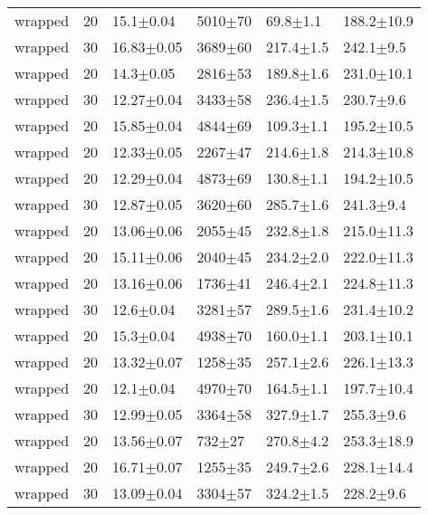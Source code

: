 \begin{tabular}{lrllll}
      wrapped &      20 &    15.1$\pm$0.04 &  5010$\pm$70 &    69.8$\pm$1.1 &  188.2$\pm$10.9 \\
      wrapped &      30 &   16.83$\pm$0.05 &  3689$\pm$60 &   217.4$\pm$1.5 &   242.1$\pm$9.5 \\
      wrapped &      20 &    14.3$\pm$0.05 &  2816$\pm$53 &   189.8$\pm$1.6 &  231.0$\pm$10.1 \\
      wrapped &      30 &   12.27$\pm$0.04 &  3433$\pm$58 &   236.4$\pm$1.5 &   230.7$\pm$9.6 \\
      wrapped &      20 &   15.85$\pm$0.04 &  4844$\pm$69 &   109.3$\pm$1.1 &  195.2$\pm$10.5 \\
      wrapped &      20 &   12.33$\pm$0.05 &  2267$\pm$47 &   214.6$\pm$1.8 &  214.3$\pm$10.8 \\
      wrapped &      20 &   12.29$\pm$0.04 &  4873$\pm$69 &   130.8$\pm$1.1 &  194.2$\pm$10.5 \\
      wrapped &      30 &   12.87$\pm$0.05 &  3620$\pm$60 &   285.7$\pm$1.6 &   241.3$\pm$9.4 \\
      wrapped &      20 &   13.06$\pm$0.06 &  2055$\pm$45 &   232.8$\pm$1.8 &  215.0$\pm$11.3 \\
      wrapped &      20 &   15.11$\pm$0.06 &  2040$\pm$45 &   234.2$\pm$2.0 &  222.0$\pm$11.3 \\
      wrapped &      20 &   13.16$\pm$0.06 &  1736$\pm$41 &   246.4$\pm$2.1 &  224.8$\pm$11.3 \\
      wrapped &      30 &    12.6$\pm$0.04 &  3281$\pm$57 &   289.5$\pm$1.6 &  231.4$\pm$10.2 \\
      wrapped &      20 &    15.3$\pm$0.04 &  4938$\pm$70 &   160.0$\pm$1.1 &  203.1$\pm$10.1 \\
      wrapped &      20 &   13.32$\pm$0.07 &  1258$\pm$35 &   257.1$\pm$2.6 &  226.1$\pm$13.3 \\
      wrapped &      20 &    12.1$\pm$0.04 &  4970$\pm$70 &   164.5$\pm$1.1 &  197.7$\pm$10.4 \\
      wrapped &      30 &   12.99$\pm$0.05 &  3364$\pm$58 &   327.9$\pm$1.7 &   255.3$\pm$9.6 \\
      wrapped &      20 &   13.56$\pm$0.07 &   732$\pm$27 &   270.8$\pm$4.2 &  253.3$\pm$18.9 \\
      wrapped &      20 &   16.71$\pm$0.07 &  1255$\pm$35 &   249.7$\pm$2.6 &  228.1$\pm$14.4 \\
      wrapped &      30 &   13.09$\pm$0.04 &  3304$\pm$57 &   324.2$\pm$1.5 &   228.2$\pm$9.6 \\

\end{tabular}
